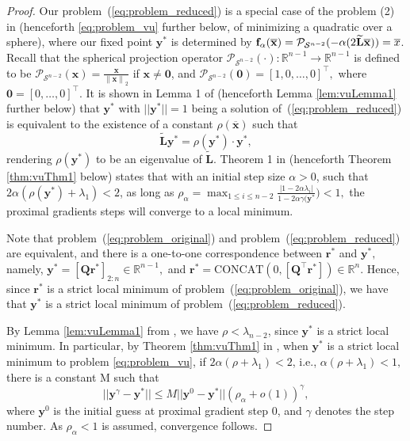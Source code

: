\documentclass[nohyperref]{article}
\theoremstyle{plain}
\theoremstyle{definition}
\theoremstyle{remark}
\begin{document}
\begin{proof} 
Our problem~(\ref{eq:problem_reduced}) is a special case of the problem (2) in \cite{vu2019convergence} (henceforth \eqref{eq:problem_vu} further below, of minimizing a quadratic over a sphere), where our fixed point $\mathbf{y}^*$ is determined by $\mathbf{f}_\alpha(\mathbf{\overline{x}})=\mathcal{P}_{\mathcal{S}^{n-2}}(-\alpha(2\widetilde{\mathbf{L}}\mathbf{\overline{x}}))=\mathbf\mathbf{\overline{x}}$. Recall that the spherical projection operator $\mathcal{P}_{\mathcal{S}^{n-2}}(\cdot):\mathbb{R}^{n-1}\rightarrow\mathbb{R}^{n-1}$ is defined to be $\mathcal{P}_{\mathcal{S}^{n-2}}(\mathbf{x})=\frac{\mathbf{x}}{\left\lVert \mathbf{x} \right\rVert_2}$ if $\mathbf{x}\neq \mathbf{0}$, and $\mathcal{P}_{\mathcal{S}^{n-2}}(\mathbf{0})=[1,0,\dots,0]^\top,$ where $\mathbf{0}=[0,\dots,0]^\top.$  
It is shown in Lemma 1 of \cite{vu2019convergence} (henceforth Lemma \ref{lem:vuLemma1} further below) that $\mathbf{y}^*$ with $||\mathbf{y}^*||=1 $ being a solution of~(\ref{eq:problem_reduced}) is equivalent to the existence of a constant   $\rho(\mathbf{\overline{x}})$ such that
$$\widetilde{\mathbf{L}}\mathbf{y}^*
=\rho(\mathbf{y}^*) \cdot \mathbf{y}^*,$$
rendering  $\rho(\mathbf{y}^*)$ to be  an eigenvalue of  $\widetilde{\mathbf{L}}$.  Theorem 1 in \cite{vu2019convergence}  (henceforth Theorem \ref{thm:vuThm1} below)  states that with an initial step size $\alpha>0$,  such that $2\alpha(\rho(
\mathbf{y}^*)+\lambda_1)<2$, as long as $\rho_\alpha=\max_{1\leq i \leq n-2}\frac{|1-2\alpha\lambda_i|}{1-2\alpha\gamma(\mathbf{y}^*})
<1,$ the proximal gradients steps will converge to a local minimum. 

Note that problem~(\ref{eq:problem_original}) and problem~(\ref{eq:problem_reduced}) are equivalent, and  there is a one-to-one correspondence between $\mathbf{r}^*$ and $\mathbf{y}^*, $ namely,  $\mathbf{y}^*=\left[\mathbf{Q}\mathbf{r}^*\right]_{2:n}\in\mathbb{R}^{n-1},$ and $\mathbf{r}^*=\text{CONCAT}(0,\left[\mathbf{Q}^\top\mathbf{r}^*\right])\in\mathbb{R}^n.$ Hence,  
since $\mathbf{r}^*$ is a strict local minimum of problem~(\ref{eq:problem_original}), we have that $\mathbf{y}^*$ is a strict local minimum of problem~(\ref{eq:problem_reduced}).

By 
Lemma \ref{lem:vuLemma1}
from  \cite{vu2019convergence}, we have $\rho<\lambda_{n-2}$, since $\mathbf{y}^*$ is a strict local minimum. In particular,
by 
Theorem \ref{thm:vuThm1}
in \cite{vu2019convergence}, when $\mathbf{y}^*$ is a strict local minimum to problem  \eqref{eq:problem_vu}, 
if $2\alpha(\rho+\lambda_1)<2$, i.e., $\alpha(\rho+\lambda_1)<1,$ there is a constant M such that 
$$ || \mathbf{y}^{\gamma} -\mathbf{y}^* ||  \leq M  || \mathbf{y}^{0} - \mathbf{y}^*|| (\rho_\alpha + o(1))^\gamma,$$
where $\mathbf{y}^{0}$ is the initial guess at proximal gradient step 0, and $\gamma$ denotes the step number. As $\rho_\alpha <1$ is assumed, convergence follows. 
\end{proof}
\end{document}
